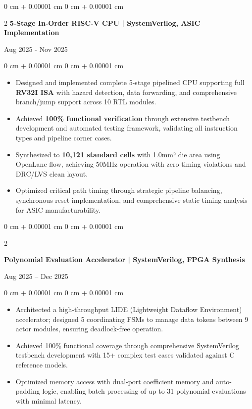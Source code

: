 \documentclass[10pt, letterpaper]{article}
\newenvironment{highlights}{
    \begin{itemize}[
        topsep=0.05 cm,
        parsep=0.05 cm,
        partopsep=0pt,
        itemsep=0pt,
        leftmargin=0 cm + 10pt
    ]
}{
    \end{itemize}
}
\newenvironment{onecolentry}{
    \begin{adjustwidth}{
        0 cm + 0.00001 cm
    }{
        0 cm + 0.00001 cm
    }
}{
    \end{adjustwidth}
}
\newenvironment{twocolentry}[2][]{
    \onecolentry
    \def\secondColumn{#2}
    \setcolumnwidth{\fill, 4.5 cm}
    \begin{paracol}{2}
}{
    \switchcolumn \raggedleft \secondColumn
    \end{paracol}
    \endonecolentry
}
\begin{document}
        \vspace{0.10 cm}
        \begin{twocolentry}{
            Aug 2025 - Nov 2025 } \textbf{5-Stage In-Order RISC-V CPU | SystemVerilog, ASIC Implementation}
        \end{twocolentry}
        \vspace{0.05 cm}
        \begin{onecolentry}
            \begin{highlights}
                \item Designed and implemented complete 5-stage pipelined CPU supporting full \textbf{RV32I ISA} with hazard detection, data forwarding, and comprehensive branch/jump support across 10 RTL modules.
                \item Achieved \textbf{100\% functional verification} through extensive testbench development and automated testing framework, validating all instruction types and pipeline corner cases.
                \item Synthesized to \textbf{10,121 standard cells} with 1.0mm² die area using OpenLane flow, achieving 50MHz operation with zero timing violations and DRC/LVS clean layout.
                \item Optimized critical path timing through strategic pipeline balancing, synchronous reset implementation, and comprehensive static timing analysis for ASIC manufacturability.
            \end{highlights}
        \end{onecolentry}

        \vspace{0.10 cm}

        \begin{twocolentry}{
            Aug 2025 – Dec 2025
        }
            \textbf{Polynomial Evaluation Accelerator | SystemVerilog, FPGA Synthesis}
        \end{twocolentry}
        \vspace{0.05 cm}
        \begin{onecolentry}
            \begin{highlights}
                \item Architected a high-throughput LIDE (Lightweight Dataflow Environment) accelerator; designed 5 coordinating FSMs to manage data tokens between 9 actor modules, ensuring deadlock-free operation.
                \item Achieved 100\% functional coverage through comprehensive SystemVerilog testbench development with 15+ complex test cases validated against C reference models.
                \item Optimized memory access with dual-port coefficient memory and auto-padding logic, enabling batch processing of up to 31 polynomial evaluations with minimal latency.
            \end{highlights}
        \end{onecolentry}
\end{document}

